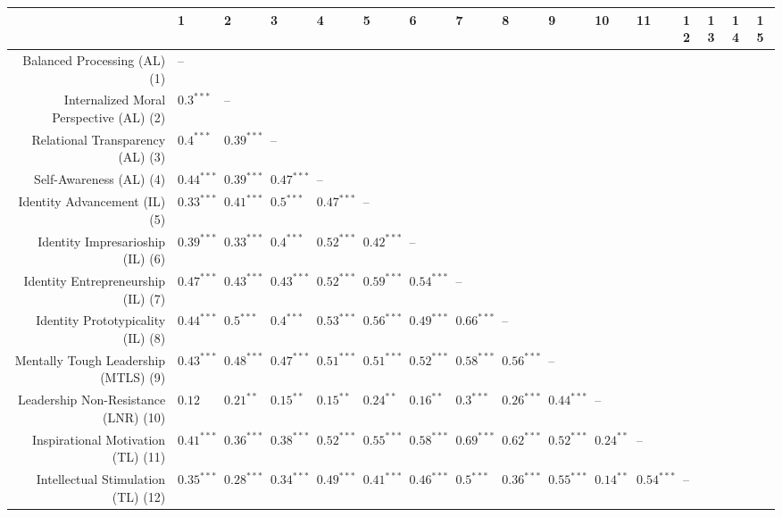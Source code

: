 \begin{table}[ht]
\centering
\begin{tabular}{rlllllllllllllll}
  \hline
 & 1 & 2 & 3 & 4 & 5 & 6 & 7 & 8 & 9 & 10 & 11 & 12 & 13 & 14 & 15 \\ 
  \hline
Balanced Processing (AL) (1) & -- &  &  &  &  &  &  &  &  &  &  &  &  &  &  \\ 
  Internalized Moral Perspective (AL) (2) & $0.3^{***}$ & -- &  &  &  &  &  &  &  &  &  &  &  &  &  \\ 
  Relational Transparency (AL) (3) & $0.4^{***}$ & $0.39^{***}$ & -- &  &  &  &  &  &  &  &  &  &  &  &  \\ 
  Self-Awareness (AL) (4) & $0.44^{***}$ & $0.39^{***}$ & $0.47^{***}$ & -- &  &  &  &  &  &  &  &  &  &  &  \\ 
  Identity Advancement (IL) (5) & $0.33^{***}$ & $0.41^{***}$ & $0.5^{***}$ & $0.47^{***}$ & -- &  &  &  &  &  &  &  &  &  &  \\ 
  Identity Impresarioship (IL) (6) & $0.39^{***}$ & $0.33^{***}$ & $0.4^{***}$ & $0.52^{***}$ & $0.42^{***}$ & -- &  &  &  &  &  &  &  &  &  \\ 
  Identity Entrepreneurship (IL) (7) & $0.47^{***}$ & $0.43^{***}$ & $0.43^{***}$ & $0.52^{***}$ & $0.59^{***}$ & $0.54^{***}$ & -- &  &  &  &  &  &  &  &  \\ 
  Identity Prototypicality (IL) (8) & $0.44^{***}$ & $0.5^{***}$ & $0.4^{***}$ & $0.53^{***}$ & $0.56^{***}$ & $0.49^{***}$ & $0.66^{***}$ & -- &  &  &  &  &  &  &  \\ 
  Mentally Tough Leadership (MTLS) (9) & $0.43^{***}$ & $0.48^{***}$ & $0.47^{***}$ & $0.51^{***}$ & $0.51^{***}$ & $0.52^{***}$ & $0.58^{***}$ & $0.56^{***}$ & -- &  &  &  &  &  &  \\ 
  Leadership Non-Resistance (LNR) (10) & $0.12$ & $0.21^{**}$ & $0.15^{**}$ & $0.15^{**}$ & $0.24^{**}$ & $0.16^{**}$ & $0.3^{***}$ & $0.26^{***}$ & $0.44^{***}$ & -- &  &  &  &  &  \\ 
  Inspirational Motivation (TL) (11) & $0.41^{***}$ & $0.36^{***}$ & $0.38^{***}$ & $0.52^{***}$ & $0.55^{***}$ & $0.58^{***}$ & $0.69^{***}$ & $0.62^{***}$ & $0.52^{***}$ & $0.24^{**}$ & -- &  &  &  &  \\ 
  Intellectual Stimulation (TL) (12) & $0.35^{***}$ & $0.28^{***}$ & $0.34^{***}$ & $0.49^{***}$ & $0.41^{***}$ & $0.46^{***}$ & $0.5^{***}$ & $0.36^{***}$ & $0.55^{***}$ & $0.14^{**}$ & $0.54^{***}$ & -- &  &  &  \\ 

\end{tabular}
\end{table}

